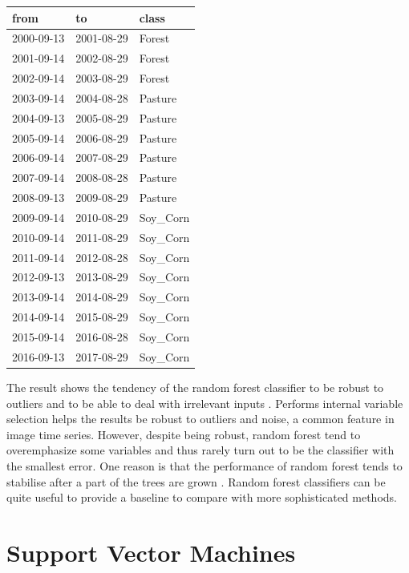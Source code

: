 \documentclass[a4paper,]{tufte-book}
\begin{document}
\begin{tabular}{l|l|l}
\hline
from & to & class\\
\hline
2000-09-13 & 2001-08-29 & Forest\\
\hline
2001-09-14 & 2002-08-29 & Forest\\
\hline
2002-09-14 & 2003-08-29 & Forest\\
\hline
2003-09-14 & 2004-08-28 & Pasture\\
\hline
2004-09-13 & 2005-08-29 & Pasture\\
\hline
2005-09-14 & 2006-08-29 & Pasture\\
\hline
2006-09-14 & 2007-08-29 & Pasture\\
\hline
2007-09-14 & 2008-08-28 & Pasture\\
\hline
2008-09-13 & 2009-08-29 & Pasture\\
\hline
2009-09-14 & 2010-08-29 & Soy\_Corn\\
\hline
2010-09-14 & 2011-08-29 & Soy\_Corn\\
\hline
2011-09-14 & 2012-08-28 & Soy\_Corn\\
\hline
2012-09-13 & 2013-08-29 & Soy\_Corn\\
\hline
2013-09-14 & 2014-08-29 & Soy\_Corn\\
\hline
2014-09-14 & 2015-08-29 & Soy\_Corn\\
\hline
2015-09-14 & 2016-08-28 & Soy\_Corn\\
\hline
2016-09-13 & 2017-08-29 & Soy\_Corn\\
\hline
\end{tabular}

The result shows the tendency of the random forest classifier to be robust to outliers and to be able to deal with irrelevant inputs \citep{Hastie2009}. Performs internal variable selection helps the results be robust to outliers and noise, a common feature in image time series. However, despite being robust, random forest tend to overemphasize some variables and thus rarely turn out to be the classifier with the smallest error. One reason is that the performance of random forest tends to stabilise after a part of the trees are grown \citep{Hastie2009}. Random forest classifiers can be quite useful to provide a baseline to compare with more sophisticated methods.

\hypertarget{support-vector-machines}{%
\section{Support Vector Machines}\label{support-vector-machines}}
\end{document}
